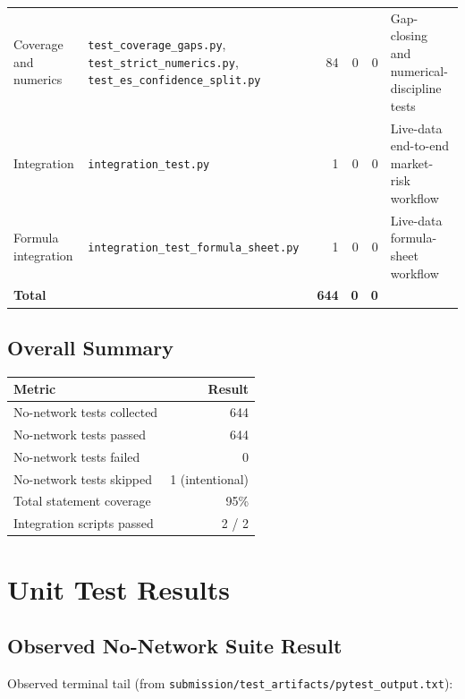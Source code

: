 \documentclass[11pt]{article}
\newcommand{\code}[1]{\texttt{#1}}
\begin{document}
\begin{center}
\begin{tabular}{L{2.4cm}L{4.5cm}rrrL{3.5cm}}
Coverage and numerics     & \code{test\_coverage\_\allowbreak gaps.py}, \code{test\_strict\_\allowbreak numerics.py}, \code{test\_es\_confidence\_\allowbreak split.py} & 84 & 0 & 0 & Gap-closing and numerical-discipline tests \\
Integration               & \code{integration\_test.py}                               &  1  & 0 & 0 & Live-data end-to-end market-risk workflow \\
Formula integration       & \code{integration\_test\_\allowbreak formula\_sheet.py}   &  1  & 0 & 0 & Live-data formula-sheet workflow \\
\midrule
\textbf{Total}            & &  \textbf{644} & \textbf{0} & \textbf{0} & \\
\bottomrule
\end{tabular}
\end{center}

\subsection{Overall Summary}

\begin{center}
\begin{tabular}{lr}
\toprule
\textbf{Metric} & \textbf{Result} \\
\midrule
No-network tests collected & 644 \\
No-network tests passed    & 644 \\
No-network tests failed    & 0 \\
No-network tests skipped   & 1 (intentional) \\
Total statement coverage   & 95\% \\
Integration scripts passed & 2 / 2 \\
\bottomrule
\end{tabular}
\end{center}

\section{Unit Test Results}

\subsection{Observed No-Network Suite Result}

Observed terminal tail (from \code{submission/test\_artifacts/pytest\_output.txt}):
\end{document}
